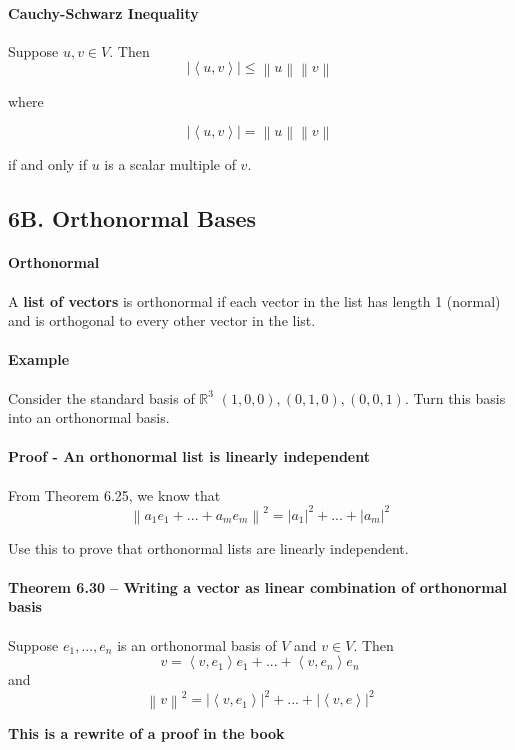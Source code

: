\documentclass{article}
\newcommand{\norm}[1]{\left\lVert#1\right\rVert}
\newcommand{\iprod}[2]{\left\langle#1,#2\right\rangle}
\newcommand{\abs}[1]{\left|#1\right|}
\begin{document}
\paragraph{Cauchy-Schwarz Inequality}
Suppose $u, v \in V$. Then
\[
    \abs{\iprod{u}{v}} \leq \norm{u}\norm{v}
\]

where 

\[
    \abs{\iprod{u}{v}} = \norm{u}\norm{v}
\]

if and only if $u$ is a scalar multiple of $v$.

\subsection*{6B. Orthonormal Bases}
\paragraph{Orthonormal} A \textbf{list of vectors} is orthonormal if each vector in the list has length 1 (normal) and is orthogonal to every other vector in the list.

\paragraph{Example} Consider the standard basis of $\mathbb{R}^3$ $(1, 0, 0), (0, 1, 0), (0, 0, 1)$. Turn this basis into an orthonormal basis.

\paragraph{Proof - An orthonormal list is linearly independent} From Theorem 6.25, we know that 
\[ \norm{a_1e_1 + ... + a_me_m}^2 = \abs{a_1}^2 + ... + \abs{a_m}^2 \]

Use this to prove that orthonormal lists are linearly independent.

\paragraph{Theorem 6.30 -- Writing a vector as linear combination of orthonormal basis}
Suppose $e_1, ..., e_n$ is an orthonormal basis of $V$ and $v \in V$. Then
\[ v = \iprod{v}{e_1}e_1 +... + \iprod{v}{e_n}e_n \]
and
\[ \norm{v}^2 = \abs{\iprod{v}{e_1}}^2 + ... + \abs{\iprod{v}{e}}^2 \]


\textbf{This is a rewrite of a proof in the book}
\end{document}
